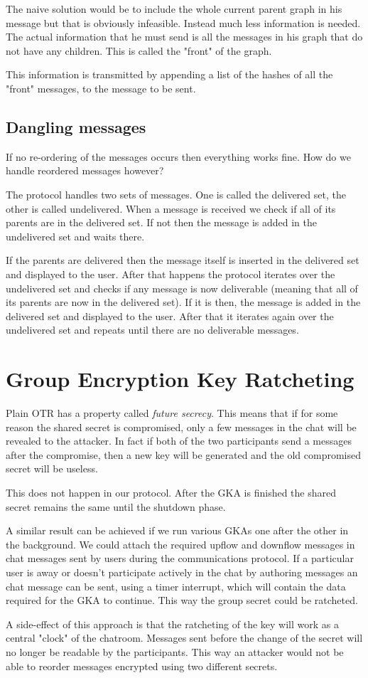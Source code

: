 The naive solution would be to include the whole current parent graph in his message but that is obviously infeasible.
Instead much less information is needed.
The actual information that he must send is all the messages in his graph that do not have any children.
This is called the "front" of the graph.

This information is transmitted by appending a list of the hashes of all the "front" messages, to the message to be sent.

\subsection{Dangling messages}

If no re-ordering of the messages occurs then everything works fine.
How do we handle reordered messages however?

The protocol handles two sets of messages.
One is called the delivered set, the other is called undelivered.
When a message is received we check if all of its parents are in the delivered set.
If not then the message is added in the undelivered set and waits there.

If the parents are delivered then the message itself is inserted in the delivered  set and displayed to the user.
After that happens the protocol iterates over the undelivered set and checks if any message is now deliverable (meaning that all of its parents are now in the delivered set).
If it is then, the message is added in the delivered set and displayed to the user.
After that it iterates again over the undelivered set and repeats until there are no deliverable messages.

\section{Group Encryption Key Ratcheting}

Plain OTR has a property called \emph{future secrecy}.
This means that if for some reason the shared secret is compromised, only a few messages in the chat will be revealed to the attacker.
In fact if both of the two participants send a messages after the compromise, then a new key will be generated and the old compromised secret will be useless.

This does not happen in our protocol.
After the GKA is finished the shared secret remains the same until the shutdown phase.

A similar result can be achieved if we run various GKAs one after the other in the background.
We could attach the required upflow and downflow messages in chat messages sent by users during the communications protocol.
If a particular user is away or doesn't participate actively in the chat by authoring messages an chat message can be sent, using a timer interrupt, which will contain the data required for the GKA to continue.
This way the group secret could be ratcheted.

A side-effect of this approach is that the ratcheting of the key will work as a central "clock" of the chatroom.
Messages sent before the change of the secret will no longer be readable by the participants.
This way an attacker would not be able to reorder messages encrypted using two different secrets.
